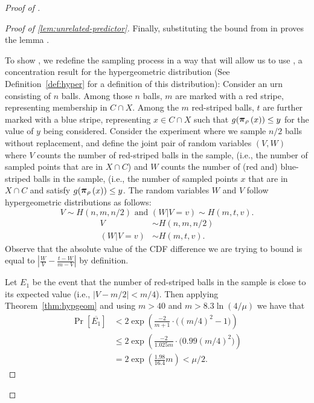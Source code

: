 \begin{proof}[Proof of ]
\begin{proof}[Proof of \cref{lem:unrelated-predictor}]
Finally, substituting the bound from  in  proves the lemma . 

\medskip\noindent
To show , we redefine the sampling process in a way that will allow us to use , a concentration result for the hypergeometric distribution (See Definition~\ref{def:hyper} for a definition of this distribution): Consider an urn consisting of $n$ balls. Among those $n$ balls, $m$ are marked with a red stripe, representing membership in $C\cap X$. Among the $m$ red-striped balls, $t$ are further marked with a blue stripe, representing $x\in C\cap X$ such that $g(\restrict{x}{\selection}) \leq y$ for the value of $y$ being considered. Consider the experiment where we sample $n/2$ balls without replacement, and define the joint pair of random variables $(V, W)$ where $V$ counts the number of red-striped balls in the sample, (i.e., the number of sampled points that are in $X\cap C$) and $W$ counts the number of (red and) blue-striped balls in the sample, (i.e., the number of sampled points $x$ that are in $X\cap C$ and satisfy $g(\restrict{x}{\selection}) \leq y$. The random variables $W$ and $V$ follow hypergeometric distributions as follows:
\ifnum{}
		$$V \sim H(n, m, n/2) \text{ and }
		(W | V = v) \sim H(m, t, v).$$
\else
    \begin{align*}
		V &\sim H(n, m, n/2) \\
		(W | V = v) &\sim H(m, t, v).
	\end{align*}
\fi
Observe that the absolute value of the CDF difference we are trying to bound is equal to $\left|\frac{W}{V} - \frac{t - W}{m - V}\right|$ by definition.

Let $E_1$ be the event that the number of red-striped balls in the sample is close to its expected value (i.e., $|V - m/2| < m/4$). Then applying Theorem~\ref{thm:hypgeom} and using $m > 40$ and $m > 8.3\ln(4/\mu)$ we have that
\begin{align*}
    \Pr[\overline{E_1}] &< 2\exp\left(\frac{-2}{m+1} \cdot \Big( (m/4)^2 - 1\Big)\right)\\
    &\leq 2\exp\left(\frac{-2}{1.025m} \cdot \Big( 0.99(m/4)^2 \Big)\right)\\
    &= 2\exp\left(\frac{1.98}{16.4}m\right) < \mu/2.
\end{align*}
	

\end{proof}
\end{proof}
